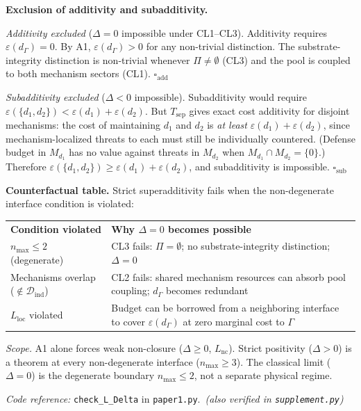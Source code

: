 \documentclass[11pt]{article}
\theoremstyle{remark}
\newcommand{\coderef}[2]{\smallskip\noindent\textit{Code reference:} \texttt{#1} in \texttt{#2}.}
\begin{document}
\begin{tcolorbox}[apfbox, title={$L_{\Delta}$ (Competition): Superadditivity from Substrate Integrity}]
\medskip\noindent\textbf{Exclusion of additivity and subadditivity.}

\textit{Additivity excluded} ($\Delta = 0$ impossible under CL1--CL3).  Additivity requires $\varepsilon(d_\Gamma) = 0$.  By A1, $\varepsilon(d_\Gamma) > 0$ for any non-trivial distinction.  The substrate-integrity distinction is non-trivial whenever $\Pi \ne \emptyset$ (CL3) and the pool is coupled to both mechanism sectors (CL1).  \hfill$\square_{\mathrm{add}}$

\textit{Subadditivity excluded} ($\Delta < 0$ impossible).  Subadditivity would require $\varepsilon(\{d_1,d_2\}) < \varepsilon(d_1) + \varepsilon(d_2)$.  But $T_{\mathrm{sep}}$ gives exact cost additivity for disjoint mechanisms: the cost of maintaining $d_1$ and $d_2$ is \emph{at least} $\varepsilon(d_1) + \varepsilon(d_2)$, since mechanism-localized threats to each must still be individually countered.  (Defense budget in $M_{d_1}$ has no value against threats in $M_{d_2}$ when $M_{d_1} \cap M_{d_2} = \{0\}$.)  Therefore $\varepsilon(\{d_1,d_2\}) \ge \varepsilon(d_1) + \varepsilon(d_2)$, and subadditivity is impossible.  \hfill$\square_{\mathrm{sub}}$

\medskip\noindent\textbf{Counterfactual table.}  Strict superadditivity fails when the non-degenerate interface condition is violated:

\smallskip
\begin{tabular}{@{}p{3.8cm}p{8.8cm}@{}}
\hline\noalign{\smallskip}
\textbf{Condition violated} & \textbf{Why $\Delta = 0$ becomes possible} \\[2pt]
$n_{\max} \le 2$ (degenerate) & CL3 fails: $\Pi = \emptyset$; no substrate-integrity distinction; $\Delta = 0$ \\
Mechanisms overlap ($\notin \mathcal{D}_{\mathrm{ind}}$) & CL2 fails: shared mechanism resources can absorb pool coupling; $d_\Gamma$ becomes redundant \\
$L_{\mathrm{loc}}$ violated & Budget can be borrowed from a neighboring interface to cover $\varepsilon(d_\Gamma)$ at zero marginal cost to $\Gamma$ \\
\end{tabular}

\medskip\noindent\textit{Scope.}  A1 alone forces weak non-closure ($\Delta \ge 0$, $L_{\mathrm{nc}}$).  Strict positivity ($\Delta > 0$) is a theorem at every non-degenerate interface ($n_{\max} \ge 3$).  The classical limit ($\Delta = 0$) is the degenerate boundary $n_{\max} \le 2$, not a separate physical regime.

\coderef{check\_L\_Delta}{paper1.py}\,%
\hspace{1em}\textit{(also verified in \texttt{supplement.py})}
\end{tcolorbox}
\end{document}
